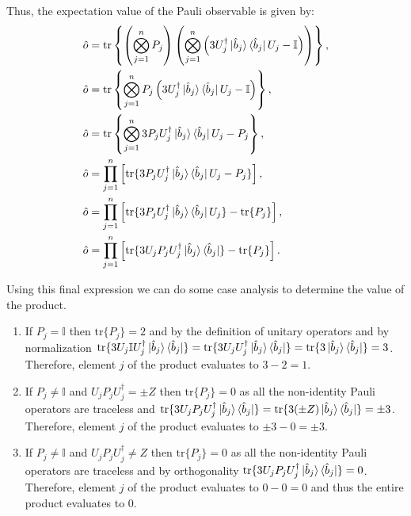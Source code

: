 \documentclass[12pt]{article}
\begin{document}
    Thus, the expectation value of the Pauli observable is given by:
    \begin{align*}
        \hat{o} &= \text{tr}\left\{\left( \bigotimes_{j=1}^n P_j \right) \left( \bigotimes^n_{j=1}\left(3U_j^\dagger\ket{\hat{b}_j}\bra{\hat{b}_j}U_j - \mathbb{I} \right) \right)\right\},\\
        \hat{o} &= \text{tr}\left\{ \bigotimes_{j=1}^n P_j  \left(3U_j^\dagger\ket{\hat{b}_j}\bra{\hat{b}_j}U_j - \mathbb{I} \right) \right\},\\
        \hat{o} &= \text{tr}\left\{ \bigotimes_{j=1}^n 3P_jU_j^\dagger\ket{\hat{b}_j}\bra{\hat{b}_j}U_j - P_j  \right\},\\
        \hat{o} &= \prod_{j=1}^n \left[ \text{tr}\{ 3 P_j U^\dagger_j \ket{\hat{b}_j}\bra{\hat{b}_j}U_j -  P_j \} \right],\\
        \hat{o} &= \prod_{j=1}^n \left[ \text{tr}\{ 3 P_j U^\dagger_j \ket{\hat{b}_j}\bra{\hat{b}_j}U_j\} - \text{tr}\{ P_j \} \right],\\
        \hat{o} &= \prod_{j=1}^n \left[ \text{tr}\{ 3 U_jP_j U^\dagger_j \ket{\hat{b}_j}\bra{\hat{b}_j}\} - \text{tr}\{ P_j \} \right].
    \end{align*}

    Using this final expression we can do some case analysis to determine the value of the product. 
    \begin{enumerate}
        \item If $P_j = \mathbb{I}$ then $\text{tr}\{ P_j \} = 2$ and by the definition of unitary operators and by normalization  $\text{tr}\{ 3 U_j \mathbb{I} U^\dagger_j \ket{\hat{b}_j}\bra{\hat{b}_j}\} = \text{tr}\{ 3 U_j U^\dagger_j \ket{\hat{b}_j}\bra{\hat{b}_j}\} = \text{tr}\{ 3 \ket{\hat{b}_j}\bra{\hat{b}_j}\} = 3$. Therefore, element $j$ of the product evaluates to $3 - 2 = 1$.
        \item If $P_j \neq \mathbb{I}$ and $U_jP_j U^\dagger_j = \pm Z$ then $\text{tr}\{ P_j \} = 0$ as all the non-identity Pauli operators are traceless and $\text{tr}\{ 3 U_jP_j U^\dagger_j \ket{\hat{b}_j}\bra{\hat{b}_j}\} = \text{tr}\{ 3 (\pm Z) \ket{\hat{b}_j}\bra{\hat{b}_j}\} = \pm 3$. Therefore, element $j$ of the product evaluates to $\pm 3 - 0 = \pm 3$.
        \item If $P_j \neq \mathbb{I}$ and $U_jP_j U^\dagger_j \neq Z$ then $\text{tr}\{ P_j \} = 0$ as all the non-identity Pauli operators are traceless and by orthogonality $\text{tr}\{ 3 U_jP_j U^\dagger_j \ket{\hat{b}_j}\bra{\hat{b}_j}\} = 0$. Therefore, element $j$ of the product evaluates to $0 - 0 = 0$ and thus the entire product evaluates to 0.
    \end{enumerate}
\end{document}

